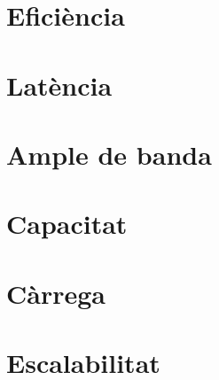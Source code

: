 \section{Eficiència}
\section{Latència}
\section{Ample de banda}
\section{Capacitat}
\section{Càrrega}
\section{Escalabilitat}
